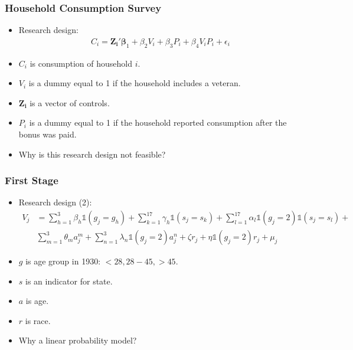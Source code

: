 \documentclass[english,xcolor=svgnames]{beamer}
\begin{document}
\begin{frame}
	\frametitle[alignment=center]{Household Consumption Survey}
	\begin{itemize}
		\item Research design:
		\begin{align*}
			C_i = \mathbf{Z_i}'\mathbf{\beta}_1 + \beta_2 V_i + \beta_3 P_i + \beta_4 V_i P_i + \epsilon_i
		\end{align*}
		\item $C_i$ is consumption of household $i$.
		\item $V_i$ is a dummy equal to 1 if the household includes a veteran.
		\item $\mathbf{Z_i}$ is a vector of controls.
		\item $P_i$ is a dummy equal to 1 if the household reported consumption after the bonus was paid.
		\item Why is this research design not feasible?
	\end{itemize}
\end{frame}

\begin{frame}
	\frametitle[alignment=center]{First Stage}
	\begin{itemize}
		\item Research design (2):
		\begin{align*}
			V_j &= \sum_{h=1}^{3}\beta_h \mathbb{1}(g_j = g_h) + \sum_{k=1}^{17}\gamma_h \mathbb{1}(s_j = s_k) + \sum_{l=1}^{17}\alpha_l \mathbb{1}(g_j = 2)\mathbb{1}(s_j = s_l) + \\
			&\sum_{m=1}^{3}\theta_m a_j^m + \sum_{n=1}^{3}\lambda_n \mathbb{1}(g_j = 2)a_j^n + \zeta r_j + \eta \mathbb{1}(g_j = 2) r_j  + \mu_j
		\end{align*}
		\item $g$ is age group in 1930: $<28, 28-45, >45$.
		\item $s$ is an indicator for state.
		\item $a$ is age.
		\item $r$ is race.
		\item Why a linear probability model?
	\end{itemize}
\end{frame}
\end{document}
